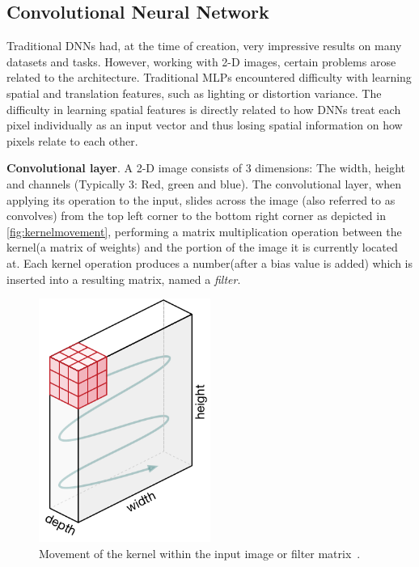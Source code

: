 \documentclass[oneside, english, bibtex]{kththesis}
\begin{document}
\subsection{Convolutional Neural Network}

Traditional DNNs had, at the time of creation, very impressive results on many datasets and tasks. However, working with 2-D images, certain problems arose related to the architecture. Traditional MLPs encountered difficulty with learning spatial and translation features, such as lighting or distortion variance. The difficulty in learning spatial features is directly related to how DNNs treat each pixel individually as an input vector and thus losing spatial information on how pixels relate to each other.

\textbf{Convolutional layer}. A 2-D image consists of 3 dimensions: The width, height and channels (Typically 3: Red, green and blue). The convolutional layer, when applying its operation to the input, slides across the image (also referred to as convolves) from the top left corner to the bottom right corner as depicted in \autoref{fig:kernelmovement}, performing a matrix multiplication operation between the kernel(a matrix of weights) and the portion of the image it is currently located at. Each kernel operation produces a number(after a bias value is added) which is inserted into a resulting matrix, named a \textit{filter}.

\begin{figure}[H]
  \begin{center}
    \includegraphics[width=0.5\textwidth]{figures/kernel_movement.png}
  \end{center}
  \caption{Movement of the kernel within the input image or filter matrix~\cite{Kang2020DeepCN}.}
  \label{fig:kernelmovement}
\end{figure}
\end{document}
